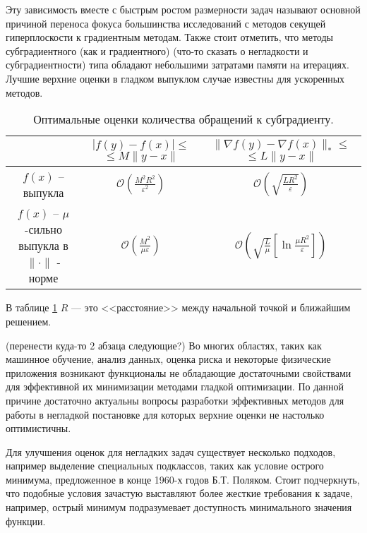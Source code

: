 Эту зависимость вместе с быстрым ростом размерности задач называют основной причиной переноса фокуса большинства исследований с методов секущей гиперплоскости к градиентным методам. Также стоит отметить, что методы субградиентного (как и градиентного) \fixme(что-то сказать о негладкости и субградиентности) типа обладают небольшими затратами памяти на итерациях. Лучшие верхние оценки в гладком выпуклом случае известны для ускоренных методов. \cite{Nesterov1983} 

\begin{table}[h]
    \caption{Оптимальные оценки количества обращений к субградиенту.}
    \label{est_tbl}
    \centering
    \begin{tabular}{|c|c|c|}
        \hline
         & \makecell{$|f(y) - f(x)| \leq$ \\ $\leq M \| y - x \|$} & \makecell{$\|\nabla f(y) - \nabla f(x)\|_* \leq $\\ $\leq L \| y - x \|$} \\
        \hline
        $f(x)$ -- выпукла & $\mathcal{O} \left( \frac{M^2 R^2}{\varepsilon^2} \right)$ & $\mathcal{O} \left( \sqrt{\frac{L R^2}{\varepsilon}} \right)$ \\
        \hline
        \makecell{$f(x)$ -- $\mu$-сильно \\ выпукла в $\| \cdot \|$ - норме} & $\mathcal{O} \left( \frac{M^2}{\mu \varepsilon} \right)$ & $\mathcal{O} \left( \sqrt{\frac{L}{\mu}} \left[\ln{\frac{\mu R^2}{\varepsilon}}\right] \right)$ \\
        \hline
    \end{tabular}
\end{table}
В таблице \ref{est_tbl} $R$ --- это <<расстояние>> между начальной точкой и ближайшим решением. 

\fixme(перенести куда-то 2 абзаца следующие?)
Во многих областях, таких как машинное обучение, анализ данных, оценка риска и некоторые физические приложения возникают функционалы не обладающие достаточными свойствами для эффективной их минимизации методами гладкой оптимизации. По данной причине достаточно актуальны вопросы разработки эффективных методов для работы в негладкой постановке для которых верхние оценки не настолько оптимистичны. 

Для улучшения оценок для негладких задач существует несколько подходов, например выделение специальных подклассов, таких как условие острого минимума, предложенное в конце 1960-х годов Б.Т. Поляком. Стоит подчеркнуть, что подобные условия зачастую выставляют более жесткие требования к задаче, например, острый минимум подразумевает доступность минимального значения функции. 

